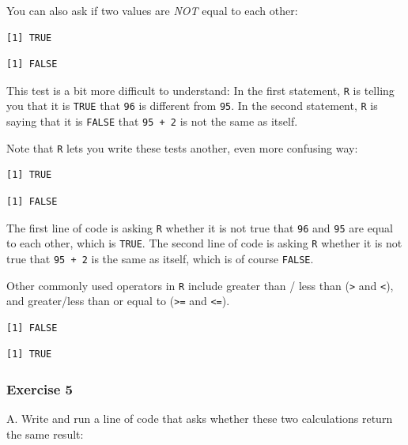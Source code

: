 \documentclass[
]{book}
\begin{document}
You can also ask if two values are \emph{NOT} equal to each other:

\begin{verbatim}
[1] TRUE
\end{verbatim}

\begin{verbatim}
[1] FALSE
\end{verbatim}

This test is a bit more difficult to understand: In the first statement, \texttt{R} is telling you that it is \texttt{TRUE} that \texttt{96} is different from \texttt{95}. In the second statement, \texttt{R} is saying that it is \texttt{FALSE} that \texttt{95\ +\ 2} is not the same as itself.

Note that \texttt{R} lets you write these tests another, even more confusing way:

\begin{verbatim}
[1] TRUE
\end{verbatim}

\begin{verbatim}
[1] FALSE
\end{verbatim}

The first line of code is asking \texttt{R} whether it is not true that \texttt{96} and \texttt{95} are equal to each other, which is \texttt{TRUE}. The second line of code is asking \texttt{R} whether it is not true that \texttt{95\ +\ 2} is the same as itself, which is of course \texttt{FALSE}.

Other commonly used operators in \texttt{R} include greater than / less than (\texttt{\textgreater{}} and \texttt{\textless{}}), and greater/less than or equal to (\texttt{\textgreater{}=} and \texttt{\textless{}=}).

\begin{verbatim}
[1] FALSE
\end{verbatim}

\begin{verbatim}
[1] TRUE
\end{verbatim}

\hypertarget{exercise-5}{%
\subsubsection*{Exercise 5}\label{exercise-5}}

A. Write and run a line of code that asks whether these two calculations return the same result:
\end{document}
